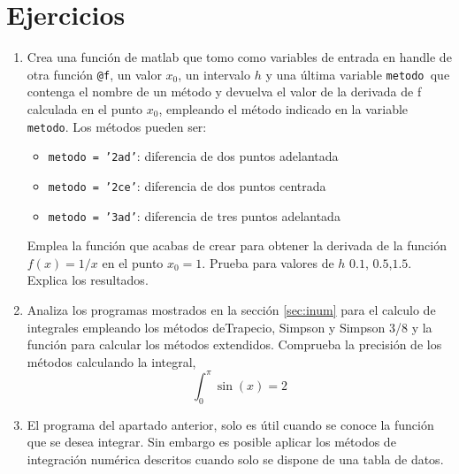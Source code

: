 \section{Ejercicios}
\begin{enumerate}
\item Crea una función de matlab que tomo como variables de entrada en handle de otra función \texttt{@f}, un valor $x_0$, un intervalo $h$ y una última variable \texttt{metodo }que contenga el nombre de un método y devuelva el valor de la derivada de f calculada en el punto $x_0$, empleando el método indicado en la variable \texttt{metodo}.  Los métodos pueden ser:
\begin{itemize}
\item \texttt{metodo = '2ad'}: diferencia de dos puntos adelantada
\item \texttt{metodo = '2ce'}: diferencia de dos puntos centrada
\item \texttt{metodo = '3ad'}: diferencia de tres puntos adelantada
\end{itemize}
Emplea la función que acabas de crear para obtener la derivada de la función $f(x) = 1/x$ en el punto $x_0 = 1$. Prueba para valores de $h$ $0.1$, $0.5$,$1.5$. Explica los resultados. 

\item Analiza los programas mostrados en la sección \ref{sec:inum} para el calculo de integrales empleando los métodos deTrapecio, Simpson y Simpson 3/8 y la función para calcular los métodos extendidos. Comprueba la precisión de los métodos calculando la integral,
\begin{equation*}
\int_0^{\pi} \sin(x) = 2
\end{equation*}

\item El programa del apartado anterior, solo es útil cuando se conoce la función que se desea integrar. Sin embargo es posible aplicar los métodos de integración numérica descritos cuando solo se dispone de una tabla de datos. 


\end{enumerate}
